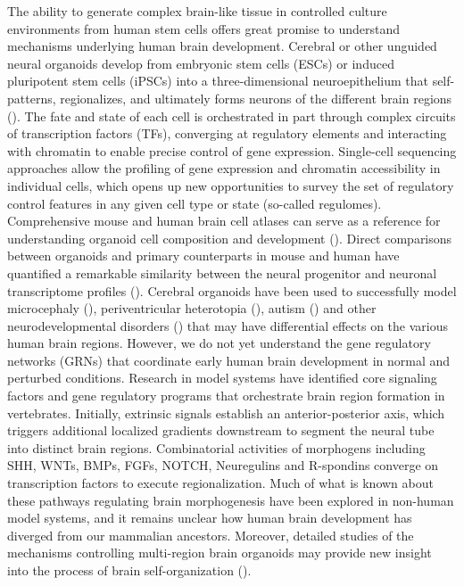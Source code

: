 The ability to generate complex brain-like tissue in controlled culture environments from human stem cells offers great promise to understand mechanisms underlying human brain development. Cerebral or other unguided neural organoids develop from embryonic stem cells (ESCs) or induced pluripotent stem cells (iPSCs) into a three-dimensional neuroepithelium that self-patterns, regionalizes, and ultimately forms neurons of the different brain regions (\cite{eiraku_self-organizing_2011,lancaster_cerebral_2013,mariani_modeling_2012}). The fate and state of each cell is orchestrated in part through complex circuits of transcription factors (TFs), converging at regulatory elements and interacting with chromatin to enable precise control of gene expression. Single-cell sequencing approaches allow the profiling of gene expression and chromatin accessibility in individual cells, which opens up new opportunities to survey the set of regulatory control features in any given cell type or state (so-called regulomes). Comprehensive mouse and human brain cell atlases can serve as a reference for understanding organoid cell composition and development (\cite{nowakowski_spatiotemporal_2017,trevino_chromatin_2020,la_manno_molecular_2021}). Direct comparisons between organoids and primary counterparts in mouse and human have quantified a remarkable similarity between the neural progenitor and neuronal transcriptome profiles (\cite{camp_human_2015,fleck_resolving_2021,pollen_establishing_2019}). Cerebral organoids have been used to successfully model microcephaly (\cite{lancaster_cerebral_2013}), periventricular heterotopia (\cite{klaus_altered_2019}), autism (\cite{mariani_foxg1-dependent_2015}) and other neurodevelopmental disorders (\cite{klingler_mapping_2021,di_lullo_use_2017}) that may have differential effects on the various human brain regions. However, we do not yet understand the gene regulatory networks (GRNs) that coordinate early human brain development in normal and perturbed conditions.
Research in model systems have identified core signaling factors and gene regulatory programs that orchestrate brain region formation in vertebrates. Initially, extrinsic signals establish an anterior-posterior axis, which triggers additional localized gradients downstream to segment the neural tube into distinct brain regions. Combinatorial activities of morphogens including SHH, WNTs, BMPs, FGFs, NOTCH, Neuregulins and R-spondins converge on transcription factors to execute regionalization. Much of what is known about these pathways regulating brain morphogenesis have been explored in non-human model systems, and it remains unclear how human brain development has diverged from our mammalian ancestors. Moreover, detailed studies of the mechanisms controlling multi-region brain organoids may provide new insight into the process of brain self-organization (\cite{biesecker_greig_2008}).
